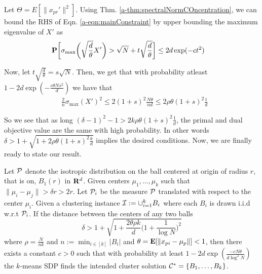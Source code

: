 Let $\Theta = E[\|x_{pr}'\|^2]$. Using Thm. \ref{a-thm:spectralNormCOncentration}, we can bound the RHS of Eqn. \ref{a-eqn:mainConstraint} by upper bounding the maximum eigenvalue of $X'$ as 
\begin{align}
  &\mathbf P\bigg[\sigma_{\max}\bigg(\sqrt{\frac{d}{\theta}}X'\bigg) > \sqrt{N} + t\sqrt{\frac{d}{\theta}} \bigg] \le 2d\exp(-ct^2)
\end{align}

Now, let $t\sqrt{\frac{d}{\theta}} = s\sqrt{N}$. Then, we get that with probability atleast $1-2d\exp(-\frac{c\theta Ns^2}{d})$ we have that 
\begin{align*}
  &\frac{2}{n}\sigma_{\max}(X')^2 \le 2(1+s)^2\frac{N\theta}{nd} \le 2\rho\theta (1+s)^2\frac{1}{d}
\end{align*}

So we see that as long $(\delta - 1)^2 - 1 > 2k\rho\theta (1+s)^2\frac{1}{d}$, the primal and dual objective value are the same with high probability. In other words $\delta > 1 + \sqrt{1+2\rho\theta(1+s)^2\frac{k}{d}}$ implies the desired conditions. Now, we are finally ready to state our result.

\begin{theorem}
\label{a-thm:SDPIsometric}
Let $\mathcal P$ denote the isotropic distribution on the ball centered at origin of radius $r$, that is on, $B_1(r)$ in $\mathbf R^d$. Given centers $\mu_1, \ldots, \mu_k$ such that $\|\mu_i - \mu_j\| > \delta r > 2 r$. Let $\mathcal P_i$ be the measure $\mathcal P$ translated with respect to the center $\mu_i$. Given a clustering instance $\mathcal I := \cup_{i=1}^k B_i$ where each $B_i$ is drawn i.i.d w.r.t $\mathcal P_i$. If the distance between the centers of any two balls
$$\delta > 1 + \sqrt{1+\frac{2\theta\rho k}{d}\Big(1+\frac{1}{\log N}\Big)^2}$$  
where $\rho = \frac{N}{nk}$ and $ n := \min_{i\in[k]} |B_i|$ and $\theta = \mathbf E[\|x_{pi}-\mu_p\|] < 1$, then there exists a constant $c > 0$ such that with probability at least $1 - 2d\exp(\frac{-cN\theta}{d\log^2N})$ the $k$-means SDP finds the intended cluster solution  $\mathcal C^* = \{B_1, \ldots, B_k\}$.
\end{theorem}

